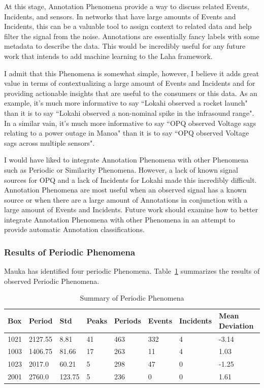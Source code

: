 At this stage, Annotation Phenomena provide a way to discuss related Events, Incidents, and sensors. In networks that have large amounts of Events and Incidents, this can be a valuable tool to assign context to related data and help filter the signal from the noise. Annotations are essentially fancy labels with some metadata to describe the data. This would be incredibly useful for any future work that intends to add machine learning to the Laha framework.

I admit that this Phenomena is somewhat simple, however, I believe it adds great value in terms of contextualizing a large amount of Events and Incidents and for providing actionable insights that are useful to the consumers or this data. As an example, it's much more informative to say ``Lokahi observed a rocket launch" than it is to say ``Lokahi observed a non-nominal spike in the infrasound range". In a similar vain, it's much more informative to say ``OPQ observed Voltage sags relating to a power outage in Manoa" than it is to say ``OPQ observed Voltage sags across multiple sensors".

I would have liked to integrate Annotation Phenomena with other Phenomena such as Periodic or Similarity Phenomena. However, a lack of known signal sources for OPQ and a lack of Incidents for Lokahi made this incredibly difficult. Annotation Phenomena are most useful when an observed signal has a known source or when there are a large amount of Annotations in conjunction with a large amount of Events and Incidents. Future work should examine how to better integrate Annotation Phenomena with other Phenomena in an attempt to provide automatic Annotation classifications.

\subsubsection{Results of Periodic Phenomena}

Mauka has identified four periodic Phenomena. Table~\ref{table:periodic_summary} summarizes the results of observed Periodic Phenomena.

\begin{table}[H]
    \centering
    \caption{Summary of Periodic Phenomena}
    \begin{tabularx}{\textwidth}{Xlllllll}
        \toprule
        \textbf{Box} & \textbf{Period} & \textbf{Std} & \textbf{Peaks} & \textbf{Periods} & \textbf{Events} & \textbf{Incidents} & \textbf{Mean Deviation} \\
        \midrule
        1021 & 2127.55 & 8.81 & 41 & 463 & 332 & 4 & -3.14 \\
        1003 & 1406.75 & 81.66 & 17 & 263 & 11 & 4 & 1.03 \\
        1023 & 2017.0 & 60.21 & 5 & 298 & 47 & 0 & -1.25 \\
        2001 & 2760.0 & 123.75 & 5 & 236 & 0 & 0 & 1.61 \\
        \bottomrule
    \end{tabularx}
    \label{table:periodic_summary}
\end{table}

